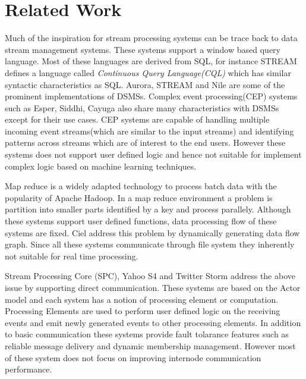 \section{Related Work}
Much of the inspiration for stream processing systems can be trace back to data stream management systems. These systems support a window based query language. Most of these languages are derived from SQL, for instance STREAM\cite{arasu2004stream} defines a language called \textit{Continuous Query Language(CQL)} which has similar syntactic characteristics as SQL. Aurora\cite{abadi2003aurora}, STREAM\cite{arasu2004stream} and Nile\cite{hammad2004nile} are some of the prominent implementations of DSMSs. Complex event processing(CEP) systems such as Esper\cite{esper}, Siddhi\cite{suhothayan2011siddhi}, Cayuga\cite{brenna2007cayuga} also share many characteristics with DSMSs except for their use cases. CEP systems are capable of handling multiple incoming event streams(which are similar to the input streams) and identifying patterns across streams which are of interest to the end users. However these systems does not support user defined logic and hence not suitable for implement complex logic based on machine 
learning techniques. 

Map reduce\cite{dean2008mapreduce} is a widely adapted technology to process batch data with the popularity of Apache Hadoop\cite{hadoop}. In a map reduce environment a problem is partition into smaller parts identified by a key and process parallely. Although these systems support user defined functions, data processing flow of these systems are fixed. Ciel\cite{murray2011ciel} address this problem by dynamically generating data flow graph. Since all these systems communicate through file system they inherently not suitable for real time processing\cite{lam2012muppet}. 

Stream Processing Core (SPC)\cite{Amini2006}, Yahoo S4\cite{neumeyer2010s4} and Twitter Storm\cite{twitterStorm} address the above issue by supporting direct communication. These systems are based on the Actor model\cite{agha1985actors} and each system has a notion of processing element or computation. Processing Elements are used to perform user defined logic on the receiving events and emit newly generated events to other processing elements. In addition to basic communication these systems provide fault tolarance features such as reliable message delivery and dynamic membership management. However most of these system does not focus on improving internode communication performance.

